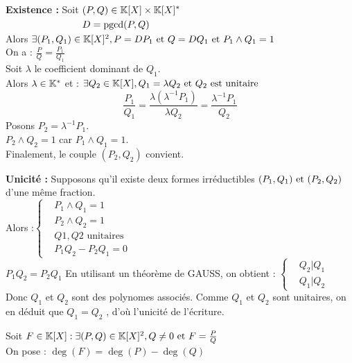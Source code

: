 \documentclass[12pt,twoside,a4paper]{article}
\DeclareMathOperator{\PGCD}{pgcd}
\begin{document}
	\begin{preuve}
		\begin{liste}
			\item \textbf{Existence :} Soit $\begin{aligned}[t]&(P,Q)\in\K[X]\times\K[X]^* \\
															   &D=\PGCD(P,Q)\end{aligned}$ \\
				Alors $\exists(P_1,Q_1)\in\mathbb{K}[X]^2,P=DP_1\text{ et } Q=DQ_1\text{ et } P_1\wedge Q_1=1$ \\
				On a : $\frac PQ=\frac{P_1}{Q_1}$ \\
				Soit $\lambda$ le coefficient dominant de $Q_1$. \\
				Alors $\lambda\in\mathbb{K}^*$ et : $\exists Q_2\in\mathbb{K}[X],Q_1=\lambda Q_2\text{ et } Q_2\text{ est unitaire}$ \\
				$$\frac{P_1}{Q_1}=\frac{\lambda(\lambda^{-1}P_1)}{\lambda Q_2}=\frac{\lambda^{-1}P_1}{Q_2}$$
				Posons $P_2=\lambda^{-1}P_1$. \\
				$P_2\wedge Q_2=1$ car $P_1\wedge Q_1=1$. \\
				Finalement, le couple $(P_2,Q_2)$ convient.
			\item \textbf{Unicit\'e :} Supposons qu'il existe deux formes irr\'eductibles $(P_1,Q_1)\text{ et }(P_2,Q_2)$ d'une m\^eme fraction. \\
				Alors :$\left\{\begin{aligned}&P_1\wedge Q_1=1 \\
											  &P_2\wedge Q_2=1 \\
											  &Q1,Q2\text{ unitaires} \\
											  &P_1Q_2-P_2Q_1=0\end{aligned}\right.$ \\
				$P_1Q_2=P_2Q_1$ En utilisant un th\'eor\`eme de GAUSS, on obtient : $\left\{\begin{aligned}&Q_2|Q_1 \\
																										   &Q_1|Q_2\end{aligned}\right.$ \\
				Donc $Q_1$ et $Q_2$ sont des polynomes associ\'es. Comme $Q_1$ et $Q_2$ sont unitaires, on en d\'eduit que $Q_1=Q_2$ , d'o\`u l'unicit\'e de l'\'ecriture.
		\end{liste}
	\end{preuve}
	\begin{defi}
		Soit $F\in\mathbb{K}[X]:\exists(P,Q)\in\mathbb{K}[X]^2,Q\neq0\text{ et } F=\frac PQ$ \\
		On pose : $\deg(F)=\deg(P)-\deg(Q)$
	\end{defi}
\end{document}
